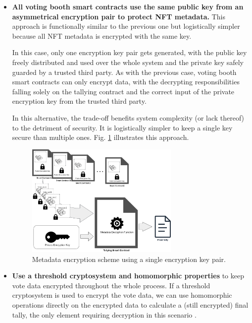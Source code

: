 \documentclass[./4_GeneralApproach.tex]{subfiles}
\begin{document}
\begin{itemize}
    \item{\textbf{All voting booth smart contracts use the same public key from an asymmetrical encryption pair to protect NFT metadata.} This approach is functionally similar to the previous one but logistically simpler because all NFT metadata is encrypted with the same key.
          \par
          In this case, only one encryption key pair gets generated, with the public key freely distributed and used over the whole system and the private key safely guarded by a trusted third party. As with the previous case, voting booth smart contracts can only encrypt data, with the decrypting responsibilities falling solely on the tallying contract and the correct input of the private encryption key from the trusted third party.
          \par
          In this alternative, the trade-off benefits system complexity (or lack thereof) to the detriment of security. It is logistically simpler to keep a single key secure than multiple ones. Fig. \ref{fig:single_encryption_key_scheme} illustrates this approach.}

          \begin{figure}[htp]
              \centering
              \includegraphics[width=0.7\textwidth]{../Images/ContractBasedSolution_encryption2.png}
              \caption{Metadata encryption scheme using a single encryption key pair.}
              \label{fig:single_encryption_key_scheme}
          \end{figure}

    \item{\textbf{Use a threshold cryptosystem and homomorphic properties} to keep vote data encrypted throughout the whole process. If a threshold cryptosystem is used to encrypt the vote data, we can use homomorphic operations directly on the encrypted data to calculate a (still encrypted) final tally, the only element requiring decryption in this scenario \cite{Benaloh1986b} \cite{Rjaskova2002}.}


\end{itemize}
\end{document}
